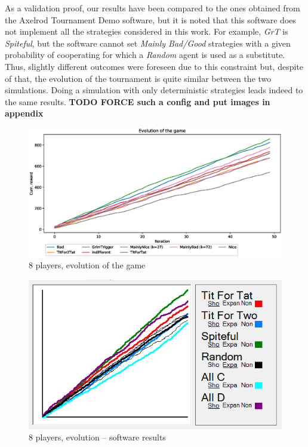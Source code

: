 \documentclass[journal,a4paper,10pt,twoside]{IEEEtran} %
\begin{document}
As a validation proof, our results have been compared to the ones obtained from the Axelrod Tournament Demo software, \cite{demosw} but it is noted that this software does not implement all the strategies considered in this work. For example, \textit{GrT} is \textit{Spiteful}, but the software cannot set \textit{Mainly Bad/Good} strategies with a given probability of cooperating for which a \textit{Random} agent is used as a substitute. Thus, slightly different outcomes were foreseen due to this constraint but, despite of that, the evolution of the tournament is quite similar between the two simulations.
Doing a simulation with only deterministic strategies leads indeed to the same results. \textbf{TODO FORCE such a config and put images in appendix}

\begin{figure}[!ht]
    \centering
	\includegraphics[width=1\columnwidth]{../img/ipdmp/ipdmp-evolution-of-game-8}
	\caption{8 players, evolution of the game}
	\label{fig:boxIPDMPevo8}
\end{figure}

\begin{figure}[!ht]
    \centering
	\includegraphics[width=.9\columnwidth]{../img/ipdmp/ipdmp8-plot-det}
	\caption{8 players, evolution -- software results \cite{demosw}}
	\label{fig:boxIPDMPevo8sw}
\end{figure}
\end{document}
